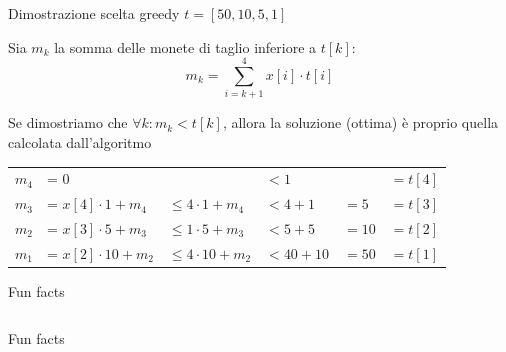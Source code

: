 \begin{frame}{Dimostrazione scelta greedy $t = [50,10,5,1]$}

\vspace{-9pt}
\BIL
\item Sia $m_k$ la somma delle monete di taglio inferiore a $t[k]$:
\[
  m_k = \sum_{i=k+1}^4 x[i] \cdot  t[i]
\]

\item 
Se dimostriamo che $\forall k: m_k < t[k]$, allora la soluzione (ottima)
è proprio quella calcolata dall'algoritmo

\bigskip
\begin{tabular}{llllll}
$m_4$ &= $0$                   &              & $< 1$       &       & $= t[4]$ \\
$m_3$ &= $x[4] \cdot 1  + m_4$ & $\leq 4 \cdot 1 + m_4$  & $< 4 + 1$   & $= 5$ & $= t[3]$ \\
$m_2$ &= $x[3] \cdot 5  + m_3$ & $\leq 1 \cdot 5 + m_3$  & $< 5 + 5$   & $=10$ & $= t[2]$ \\
$m_1$ &= $x[2] \cdot 10 + m_2$ & $\leq 4 \cdot 10 + m_2$ & $< 40 + 10$ & $=50$ & $= t[1]$ 
\end{tabular}
\EIL

\end{frame}

\begin{OnlySlides}{Fun facts}

\vspace{-18pt}
\begin{columns}[T]
\vspace{-3pt}
\begin{center}
\vspace{-3pt}
\end{center}
\end{columns}    
\smallskip
{}
\begin{center}
\end{center}

\end{OnlySlides}

\begin{OnlySlides}{Fun facts}
\vspace{-12pt}
\end{OnlySlides}


